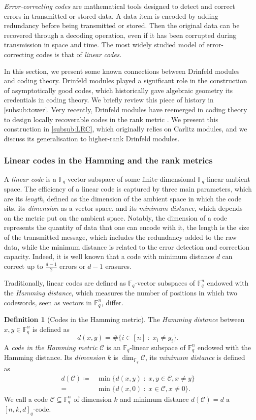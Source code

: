 \documentclass[11pt]{article}
\theoremstyle{definition}
\newtheorem{definition}[theorem]{Definition}
\newcommand\Fq{\mathbb{F}_q}
\begin{document}
\emph{Error-correcting codes} are mathematical tools designed to detect and correct errors in transmitted or stored data. A data item is encoded by adding redundancy before being transmitted or stored. Then the original data can be recovered through a decoding operation, even if it has been corrupted during transmission in space and time. 
The most widely studied model of error-correcting codes is that of \emph{linear codes}. 

In this section, we present some known connections between Drinfeld modules and coding theory. Drinfeld modules played a significant role in the construction of asymptotically good codes, which historically gave algebraic geometry its credentials in coding theory. We briefly review this piece of history in \cref{subsub:tower}. Very recently, Drinfeld modules have reemerged in coding theory to design locally recoverable codes in the rank metric \cite{BDM24preprint}. We present this construction in \cref{subsub:LRC}, which originally relies on Carlitz modules, and we discuss its generalisation to higher-rank Drinfeld modules.

\subsubsection{Linear codes in the Hamming and the rank metrics}

A \emph{linear code} is a $\Fq$-vector subspace of some finite-dimensional $\Fq$-linear ambient space. The efficiency of a linear code is captured by three main parameters, which are its \emph{length}, defined as the dimension of the ambient space in which the code sits, its \emph{dimension} as a vector space, and its \emph{minimum distance}, which depends on the metric put on the ambient space. Notably, the dimension of a code represents the quantity of data that one can encode with it, the length is the size of the transmitted message, which includes the redundancy added to the raw data, while the minimum distance is related to the error detection and correction capacity. Indeed, it is well known that a code with minimum distance $d$ can correct up to $\frac{d-1}{2}$ errors or $d-1$ erasures.

 Traditionally, linear codes are defined as $\Fq$-vector subspaces of $\Fq^n$ endowed with the \emph{Hamming distance}, which measures the number of positions in which two codewords, seen as vectors in $\Fq^n$, differ.
 \begin{definition}[Codes in the Hamming metric]   
The \emph{Hamming distance} between $x,y\in\Fq^{n}$ is defined as 
\[d(x,y)=\#\{i\in[n]\;:\; x_i\neq y_i\}.\]
A \emph{code in the Hamming metric} $\mathcal{C}$ is an $\Fq$-linear subspace of $\Fq^{n}$ endowed with the Hamming distance. Its \emph{dimension} $k$ is $\dim_{\Fq} \mathcal{C}$, its \emph{minimum distance} is defined as 
\begin{align*}
d(\mathcal{C})\coloneqq
&\min\{d(x,y)\;:\; x,y\in\mathcal{C},x\neq y\}\\
=&\min\{d(x,0)\;:\; x\in\mathcal{C},x\neq 0\}.
\end{align*}
We call a code $\mathcal{C}\subseteq \Fq^{n}$ of dimension $k$ and minimum distance $d(\mathcal{C})=d$ a $[n,k,d]_q$-code. 
\end{definition}
\end{document}
